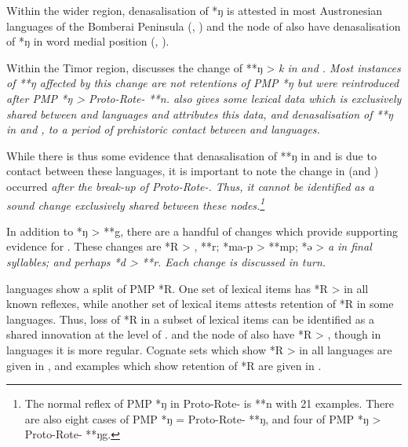Within the wider region,
denasalisation of *ŋ is attested in most Austronesian languages
of the Bomberai Peninsula (,
) and the  node of 
also have denasalisation of *ŋ in word medial position (, ).

Within the Timor region,
\citet[67--68]{Edwards2021} discusses the change of **ŋ > \it{k}
in  and .
Most instances of  **ŋ affected by this change
are not retentions of PMP *ŋ but were reintroduced after PMP
*ŋ > Proto-Rote- **n.
\citet[67]{Edwards2021} also gives some lexical data which is
exclusively shared between 
and  languages
and attributes this data,
and denasalisation of **ŋ in 
and , to a period of prehistoric contact between 
and  languages.

While there is thus some evidence that denasalisation of **ŋ
in  and  is due to contact between these languages,
it is important to note the change in  (and ) occurred \it{after} the break-up of Proto-Rote-.
Thus, it cannot be identified as a sound change exclusively shared
between these nodes.\footnote{
		The normal reflex of PMP *ŋ in
		Proto-Rote- is **n with 21 examples.
		There are also eight cases of PMP *ŋ = Proto-Rote- **ŋ,
		and four of PMP *ŋ > Proto-Rote- **ŋg.}

In addition to *ŋ > **g,
there are a handful of changes which provide supporting evidence for .
These changes are *R > {\0},
**r; *ma-p > **mp; *ə > \it{a} in final syllables;
and perhaps *d > **r.
Each change is discussed in turn.

 languages show a split of PMP *R.
One set of lexical items has *R > {\0} in all known  reflexes, while another set of lexical items attests retention of *R in some languages.
Thus, loss of *R in a subset of lexical items can be identified
as a shared innovation at the level of .
 and the  node of 
also have *R > {\0},
though in  languages it is more regular.
Cognate sets which show *R > {\0} in all 
languages are given in ,
and examples which show retention of *R are given in .


